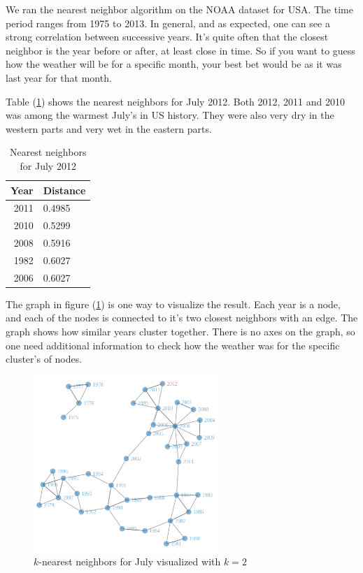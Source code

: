 We ran the nearest neighbor algorithm on the NOAA dataset for USA. The time period
ranges from 1975 to 2013. In general, and as expected, one can see a strong correlation 
between successive years. It's quite often that the closest neighbor is the year before
or after, at least close in time. So if you want to guess how the weather will be for a
specific month, your best bet would be as it was last year for that month. 

Table (\ref{tab:NN_jul2012}) shows the nearest neighbors for July 2012. Both 2012, 2011 and
2010 was among the warmest July's in US history. They were also very dry in the western parts and
very wet in the eastern parts. 

\begin{table}[ht]
\centering
\caption{Nearest neighbors for July 2012}
\label{tab:NN_jul2012}
\vspace{0.5cm}
\begin{tabular}{rl}
  \hline
  Year & Distance \\ 
  \hline
  2011 & 0.4985 \\ 
  2010 & 0.5299 \\ 
  2008 & 0.5916 \\ 
  1982 & 0.6027 \\ 
  2006 & 0.6027 \\ 
  \hline
\end{tabular}
\end{table}

The graph in figure (\ref{fig:NNgraph}) is one way to visualize the result. Each year is a node, and each
of the nodes is connected to it's two closest neighbors with an edge. The graph shows
how similar years cluster together. There is no axes on the graph, so one need additional
information to check how the weather was for the specific cluster's of nodes. 

\begin{figure}[tb]
 	\begin{center}
 		\includegraphics[width=7cm]{figures/NNgraph.png}
 	\end{center}
 	\caption{$k$-nearest neighbors for July visualized with $k = 2$}
 	\label{fig:NNgraph}
 \end{figure} 

